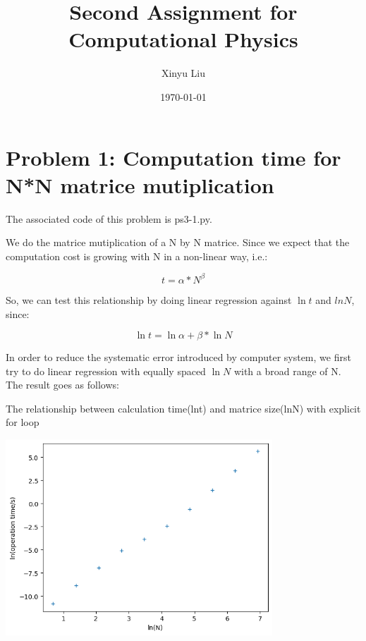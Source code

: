 \documentclass[letterpaper,12pt]{article}
\title{Second Assignment for Computational Physics}
\date{\today}
\author{Xinyu Liu}
\begin{document}
\maketitle
\tableofcontents

\section{Problem 1: Computation time for N*N matrice mutiplication}

The associated code of this problem is ps3-1.py.

We do the matrice mutiplication of a N by N matrice. Since we expect that the computation cost is growing with N in a non-linear way, i.e.:

\begin{equation}
    t = \alpha * N^{\beta}
\end{equation}

So, we can test this relationship by doing linear regression against $\ln{t}$ and $ln{N}$, since:

\begin{equation}
    \ln{t} = \ln{\alpha} + \beta * \ln{N}
\end{equation}

In order to reduce the systematic error introduced by computer system, we first try to do linear regression with equally spaced $\ln{N}$ with a broad range of N. The result goes as follows:

\begin{table}[!h]
    \centering
    \caption{The relationship between calculation time(lnt) and matrice size(lnN) with explicit for loop}
    \includegraphics[width=10cm]{ps3-11.png}
    \label{plot}%
\end{table}%
\end{document}
